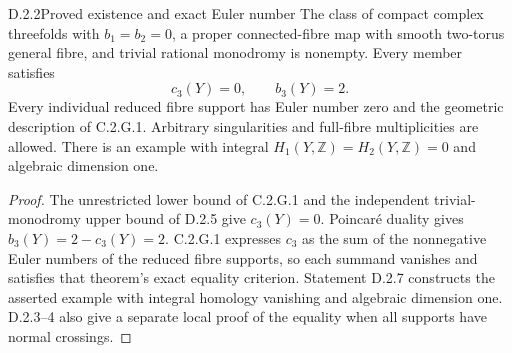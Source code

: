 \begin{idstatement}{D.2.2}{Proved existence and exact Euler number}\label{st:D.2.2}
The class of compact complex threefolds with $b_1=b_2=0$,
a proper connected-fibre map with smooth two-torus general fibre,
and trivial rational monodromy is nonempty. Every member satisfies
\[
                   c_3(Y)=0,\qquad b_3(Y)=2.
\]
Every individual reduced fibre support has Euler number zero and
the geometric description of C.2.G.1. Arbitrary singularities and
full-fibre multiplicities are allowed. There is an example with
integral $H_1(Y,\mathbb Z)=H_2(Y,\mathbb Z)=0$ and
algebraic dimension one.
\end{idstatement}
\begin{proof}
The unrestricted lower bound of C.2.G.1 and the independent
trivial-monodromy upper bound of D.2.5 give $c_3(Y)=0$.
Poincar\'e duality gives $b_3(Y)=2-c_3(Y)=2$.
C.2.G.1 expresses $c_3$ as the sum of the nonnegative
Euler numbers of the reduced fibre supports, so each summand
vanishes and satisfies that theorem's exact equality criterion.
Statement D.2.7 constructs the asserted example with integral
homology vanishing and algebraic dimension one. D.2.3--4 also
give a separate local proof of the equality when all supports
have normal crossings.
\end{proof}



